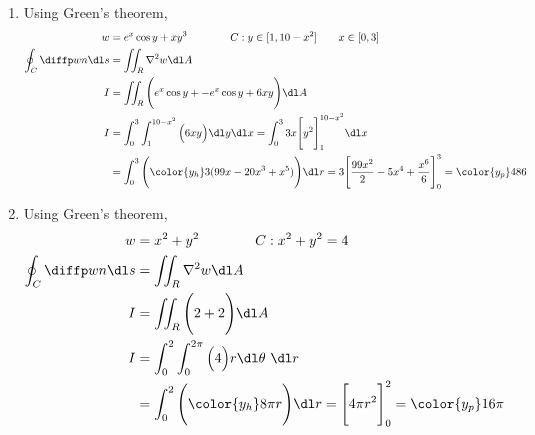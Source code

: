 \begin{enumerate}
    \item Using Green's theorem,
          \begin{align}
              w                       & = e^x \cos y + xy^3 \qquad \qquad
              C : y \in [1, 10 - x^2] \qquad x \in [0, 3]                  \\
              \oint_C \diffp wn \dl s & = \iint_R \nabla^2 w \dl A         \\
              I                       & = \iint_R \Bigg( e^x \cos y +
              -e^x \cos y + 6xy \Bigg) \dl A                               \\
              I                       & = \int_{0}^{3} \int_{1}^{10 - x^2}
              \Big( 6xy\Big) \dl y \dl x
              =  \int_{0}^{3} 3x \Bigg[
              y^2 \Bigg]_{1}^{10 - x^2} \dl x                              \\
                                      & = \int_{0}^{3} \Bigg({\color{y_h}
                          3(99x - 20x^3 + x^5) } \Bigg) \dl r
              = 3\Bigg[ \frac{99x^2}{2} - 5x^4 + \frac{x^6}{6} \Bigg]_{0}^{3}
              = \color{y_p} 486
          \end{align}

    \item Using Green's theorem,
          \begin{align}
              w                       & = x^2 + y^2 \qquad \qquad
              C : x^2 + y^2 = 4                                             \\
              \oint_C \diffp wn \dl s & = \iint_R \nabla^2 w \dl A          \\
              I                       & = \iint_R \Bigg( 2 + 2 \Bigg) \dl A \\
              I                       & = \int_{0}^{2} \int_{0}^{2\pi}
              \Big( 4 \Big) r \dl \theta\ \dl r                             \\
                                      & = \int_{0}^{2} \Bigg({\color{y_h}
                  8\pi r } \Bigg) \dl r
              = \Bigg[ 4\pi r^2 \Bigg]_{0}^{2}
              = \color{y_p} 16\pi
          \end{align}


\end{enumerate}
